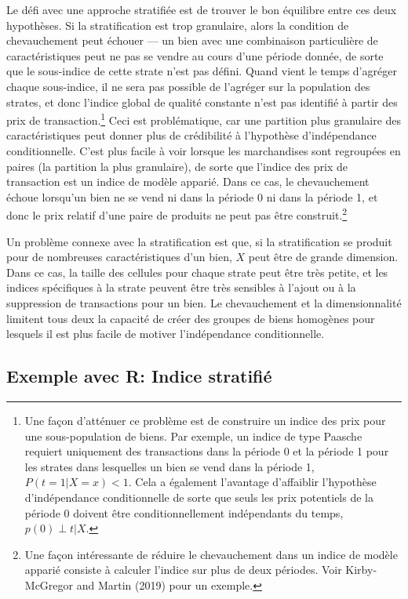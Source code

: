 \documentclass[
]{article}
\begin{document}
Le défi avec une approche stratifiée est de trouver le bon équilibre entre ces deux hypothèses. Si la stratification est trop granulaire, alors la condition de chevauchement peut échouer --- un bien avec une combinaison particulière de caractéristiques peut ne pas se vendre au cours d'une période donnée, de sorte que le sous-indice de cette strate n'est pas défini. Quand vient le temps d'agréger chaque sous-indice, il ne sera pas possible de l'agréger sur la population des strates, et donc l'indice global de qualité constante n'est pas identifié à partir des prix de transaction.\footnote{Une façon d'atténuer ce problème est de construire un indice des prix pour une sous-population de biens. Par exemple, un indice de type Paasche requiert uniquement des transactions dans la période 0 et la période 1 pour les strates dans lesquelles un bien se vend dans la période 1, \(P (t = 1 | X = x) <1\). Cela a également l'avantage d'affaiblir l'hypothèse d'indépendance conditionnelle de sorte que seuls les prix potentiels de la période 0 doivent être conditionnellement indépendants du temps, \(p(0)\perp t | X\).} Ceci est problématique, car une partition plus granulaire des caractéristiques peut donner plus de crédibilité à l'hypothèse d'indépendance conditionnelle. C'est plus facile à voir lorsque les marchandises sont regroupées en paires (la partition la plus granulaire), de sorte que l'indice des prix de transaction est un indice de modèle apparié. Dans ce cas, le chevauchement échoue lorsqu'un bien ne se vend ni dans la période 0 ni dans la période 1, et donc le prix relatif d'une paire de produits ne peut pas être construit.\footnote{Une façon intéressante de réduire le chevauchement dans un indice de modèle apparié consiste à calculer l'indice sur plus de deux périodes. Voir Kirby-McGregor and Martin (2019) pour un exemple.}

Un problème connexe avec la stratification est que, si la stratification se produit pour de nombreuses caractéristiques d'un bien, \(X\) peut être de grande dimension. Dans ce cas, la taille des cellules pour chaque strate peut être très petite, et les indices spécifiques à la strate peuvent être très sensibles à l'ajout ou à la suppression de transactions pour un bien. Le chevauchement et la dimensionnalité limitent tous deux la capacité de créer des groupes de biens homogènes pour lesquels il est plus facile de motiver l'indépendance conditionnelle.

\hypertarget{exemple-avec-r-indice-stratifiuxe9}{%
\subsection{Exemple avec R: Indice stratifié}\label{exemple-avec-r-indice-stratifiuxe9}}
\end{document}
